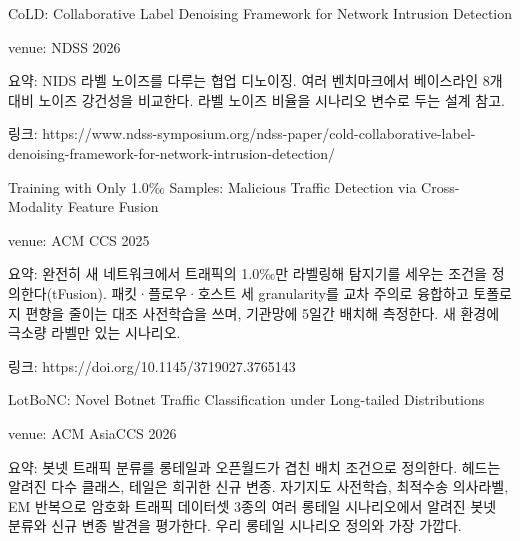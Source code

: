 \par\noindent \textbullet\enspace CoLD: Collaborative Label Denoising Framework for Network Intrusion Detection


\par\noindent \textbullet\enspace venue: NDSS 2026


\par\noindent \textbullet\enspace 요약: NIDS 라벨 노이즈를 다루는 협업 디노이징. 여러 벤치마크에서 베이스라인 8개 대비 노이즈 강건성을 비교한다. 라벨 노이즈 비율을 시나리오 변수로 두는 설계 참고.


\par\noindent \textbullet\enspace 링크: https:/\allowbreak{}/\allowbreak{}www.ndss-symposium.org/\allowbreak{}ndss-paper/\allowbreak{}cold-collaborative-label-denoising-framework-for-network-intrusion-detection/\allowbreak{}


\par\noindent \textbullet\enspace Training with Only 1.0‰ Samples: Malicious Traffic Detection via Cross-Modality Feature Fusion


\par\noindent \textbullet\enspace venue: ACM CCS 2025


\par\noindent \textbullet\enspace 요약: 완전히 새 네트워크에서 트래픽의 1.0‰만 라벨링해 탐지기를 세우는 조건을 정의한다(tFusion). 패킷·플로우·호스트 세 granularity를 교차 주의로 융합하고 토폴로지 편향을 줄이는 대조 사전학습을 쓰며, 기관망에 5일간 배치해 측정한다. 새 환경에 극소량 라벨만 있는 시나리오.


\par\noindent \textbullet\enspace 링크: https:/\allowbreak{}/\allowbreak{}doi.org/\allowbreak{}10.1145/\allowbreak{}3719027.3765143


\par\noindent \textbullet\enspace LotBoNC: Novel Botnet Traffic Classification under Long-tailed Distributions


\par\noindent \textbullet\enspace venue: ACM AsiaCCS 2026


\par\noindent \textbullet\enspace 요약: 봇넷 트래픽 분류를 롱테일과 오픈월드가 겹친 배치 조건으로 정의한다. 헤드는 알려진 다수 클래스, 테일은 희귀한 신규 변종. 자기지도 사전학습, 최적수송 의사라벨, EM 반복으로 암호화 트래픽 데이터셋 3종의 여러 롱테일 시나리오에서 알려진 봇넷 분류와 신규 변종 발견을 평가한다. 우리 롱테일 시나리오 정의와 가장 가깝다.


